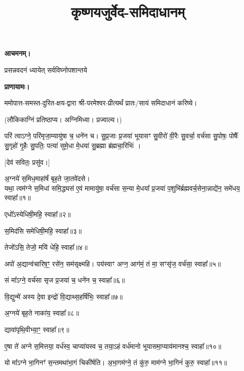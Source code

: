 \setmainfont[Script=Devanagari,Mapping=tex-text,Mapping=devanagarinumerals,AutoFakeBold=2.0]{Siddhanta}
\title{\Huge कृष्णयजुर्वेद-समिदाधानम्}
\date{}
\maketitle
\tableofcontents 

\clearpage
{}

\textbf{आचमनम्।}

{प्रसन्नवदनं ध्यायेत् सर्वविघ्नोपशान्तये}
 
\textbf{प्राणायामः।} 

ममोपात्त-समस्त-दुरित-क्षय-द्वारा श्री-परमेश्वर-प्रीत्यर्थं प्रातः/सायं समिदाधानं करिष्ये।

(लौकिकाग्निं प्रतिष्ठाप्य। अग्निमिध्वा। प्रज्वाल्य।)

परि॑ त्वाऽग्ने॒ परि॑मृजा॒म्यायु॑षा च॒ धने॑न च। सु॒प्र॒जाः प्र॒जया॑ भूयासꣳ सु॒वीरो॑ वी॒रैः सु॒वर्चा॒ वर्च॑सा सु॒पोषः॒ पोषैः᳚ सु॒गृहो॑ गृ॒हैः सु॒पतिः॒ पत्या॑ सुमे॒धा मे॒धया॑ सु॒ब्रह्मा ब्र॑ह्मचा॒रिभिः॑ ।

[देव॑ सवितः॒ प्रसु॑व।]

अ॒ग्नये॑ स॒मिध॒माहा॑र्\mbox{}षं बृह॒ते जा॒तवे॑दसे।\\
यथा॒ त्वम॑ग्ने स॒मिधा॑ समि॒द्ध्यस॑ ए॒वं मामायु॑षा॒ वर्च॑सा स॒न्या मे॒धया᳚ प्र॒जया॑ प॒शुभि॑र्ब्रह्मवर्च॒सेना॒न्नाद्ये॑न॒ समे॑धय॒ स्वाहा᳚॥१॥

एधो᳚ऽस्येधिषी॒महि॒ स्वाहा᳚॥२॥

स॒मिद॑सि समेधिषी॒महि॒ स्वाहा᳚॥३॥

तेजो॑ऽसि॒ तेजो॒ मयि॑ धेहि॒ स्वाहा᳚॥४॥

अपो॑ अ॒द्यान्व॑चारिष॒ꣳ॒ रसे॑न॒ सम॑सृक्ष्महि। पय॑स्वाꣳ अग्न॒ आग॑मं॒ तं मा॒ सꣳसृ॑ज॒ वर्च॑सा॒ स्वाहा᳚॥५॥

सं मा᳚ऽग्ने॒ वर्च॑सा सृज प्र॒जया॑ च॒ धने॑न च॒ स्वाहा᳚॥६॥

वि॒द्युन्मे॑ अस्य दे॒वा इन्द्रो॑ वि॒द्याथ्स॒हर्\mbox{}षि॑भिः॒ स्वाहा᳚॥७॥

अ॒ग्नये॑ बृह॒ते नाका॑य॒ स्वाहा᳚॥८॥

द्यावा॑पृथि॒वीभ्या॒ꣳ॒ स्वाहा᳚॥९॥

ए॒षा ते॑ अग्ने स॒मित्तया॒ वर्ध॑स्व॒ चाप्या॑यस्व च॒ तया॒ऽहं वर्ध॑मानो भूयासमा॒प्याय॑मानश्च॒ स्वाहा᳚॥१०॥

यो मा᳚ऽग्ने भा॒गिनꣳ॑ स॒न्तमथा॑भा॒गं चिकी॑र्\mbox{}षति। अ॒भा॒गम॑ग्ने॒ तं कु॑रु॒ माम॑ग्ने भा॒गिनं॑ कुरु॒ स्वाहा᳚॥११॥

